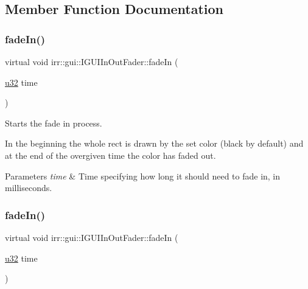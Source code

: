 \subsection{Member Function Documentation}
\mbox{\label{classirr_1_1gui_1_1IGUIInOutFader_a407edab8f7e349612d62c39accc159e2}} 
\subsubsection{\texorpdfstring{fade\+In()}{fadeIn()}\hspace{0.1cm}{\footnotesize\ttfamily [1/2]}}
{\footnotesize\ttfamily virtual void irr\+::gui\+::\+I\+G\+U\+I\+In\+Out\+Fader\+::fade\+In (\begin{DoxyParamCaption}\item[{\hyperlink{namespaceirr_a0416a53257075833e7002efd0a18e804}{u32}}]{time }\end{DoxyParamCaption})\hspace{0.3cm}{\ttfamily [pure virtual]}}



Starts the fade in process. 

In the beginning the whole rect is drawn by the set color (black by default) and at the end of the overgiven time the color has faded out. 
\begin{DoxyParams}{Parameters}
{\em time} & Time specifying how long it should need to fade in, in milliseconds. \\
\hline
\end{DoxyParams}
\mbox{\label{classirr_1_1gui_1_1IGUIInOutFader_a407edab8f7e349612d62c39accc159e2}} 
\subsubsection{\texorpdfstring{fade\+In()}{fadeIn()}\hspace{0.1cm}{\footnotesize\ttfamily [2/2]}}
{\footnotesize\ttfamily virtual void irr\+::gui\+::\+I\+G\+U\+I\+In\+Out\+Fader\+::fade\+In (\begin{DoxyParamCaption}\item[{\hyperlink{namespaceirr_a0416a53257075833e7002efd0a18e804}{u32}}]{time }\end{DoxyParamCaption})\hspace{0.3cm}{\ttfamily [pure virtual]}}



